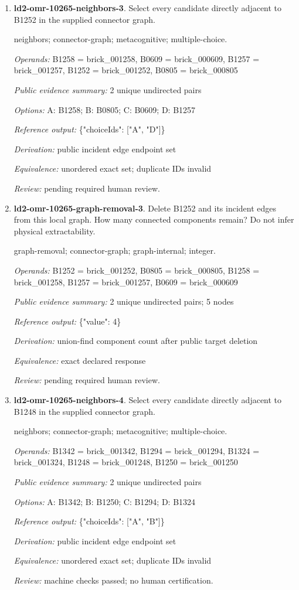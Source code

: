 \begin{enumerate}
\item \textbf{ld2-omr-10265-neighbors-3}. Select every candidate directly adjacent to B1252 in the supplied connector graph.
\par{\small neighbors; connector-graph; metacognitive; multiple-choice.\par\textit{Operands:} B1258 = brick\_001258, B0609 = brick\_000609, B1257 = brick\_001257, B1252 = brick\_001252, B0805 = brick\_000805\par\textit{Public evidence summary:} 2 unique undirected pairs\par\textit{Options:} A: B1258; B: B0805; C: B0609; D: B1257\par\textit{Reference output:} \{"choiceIds": ["A", "D"]\}\par\textit{Derivation:} public incident edge endpoint set\par\textit{Equivalence:} unordered exact set; duplicate IDs invalid\par\textit{Review:} pending required human review.}
\item \textbf{ld2-omr-10265-graph-removal-3}. Delete B1252 and its incident edges from this local graph. How many connected components remain? Do not infer physical extractability.
\par{\small graph-removal; connector-graph; graph-internal; integer.\par\textit{Operands:} B1252 = brick\_001252, B0805 = brick\_000805, B1258 = brick\_001258, B1257 = brick\_001257, B0609 = brick\_000609\par\textit{Public evidence summary:} 2 unique undirected pairs; 5 nodes\par\textit{Reference output:} \{"value": 4\}\par\textit{Derivation:} union-find component count after public target deletion\par\textit{Equivalence:} exact declared response\par\textit{Review:} pending required human review.}
\item \textbf{ld2-omr-10265-neighbors-4}. Select every candidate directly adjacent to B1248 in the supplied connector graph.
\par{\small neighbors; connector-graph; metacognitive; multiple-choice.\par\textit{Operands:} B1342 = brick\_001342, B1294 = brick\_001294, B1324 = brick\_001324, B1248 = brick\_001248, B1250 = brick\_001250\par\textit{Public evidence summary:} 2 unique undirected pairs\par\textit{Options:} A: B1342; B: B1250; C: B1294; D: B1324\par\textit{Reference output:} \{"choiceIds": ["A", "B"]\}\par\textit{Derivation:} public incident edge endpoint set\par\textit{Equivalence:} unordered exact set; duplicate IDs invalid\par\textit{Review:} machine checks passed; no human certification.}

\end{enumerate}

